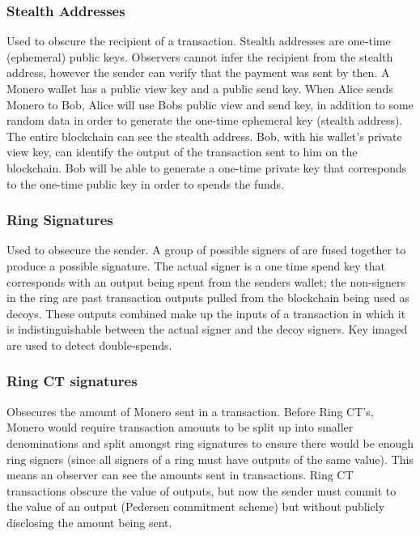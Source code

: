 \subsubsection{Stealth Addresses}
Used to obscure the recipient of a transaction. Stealth addresses are one-time (ephemeral) public keys. Observers cannot infer the recipient from the stealth address, however the sender can verify that the payment was sent by then. A Monero wallet has a public view key and a public send key. When Alice sends Monero to Bob, Alice will use Bobs public view and send key, in addition to some random data in order to generate the one-time ephemeral key (stealth address). The entire blockchain can see the stealth address. Bob, with his wallet's private view key, can identify the output of the transaction sent to him on the blockchain. Bob will be able to generate a one-time private key that corresponds to the one-time public key in order to spends the funds. 

\subsubsection{Ring Signatures}
Used to obsecure the sender.
A group of possible signers of are fused together to produce a possible signature. The actual signer is a one time spend key that corresponds with an output being spent from the senders wallet; the non-signers in the ring are past transaction outputs pulled from the blockchain being used as decoys. These outputs combined make up the inputs of a transaction in which it is indistinguishable between the actual signer and the decoy signers. Key imaged are used to detect double-spends. 

\subsubsection{Ring CT signatures}
Obsecures the amount of Monero sent in a transaction. 
Before Ring CT's, Monero would require transaction amounts to be split up into smaller denominations and split amongst ring signatures to ensure there would be enough ring signers (since all signers of a ring must have outputs of the same value). This means an observer can see the amounts sent in transactions. Ring CT transactions obscure the value of outputs, but now the sender must commit to the value of an output (Pedersen commitment scheme) but without publicly disclosing the amount being sent. 




